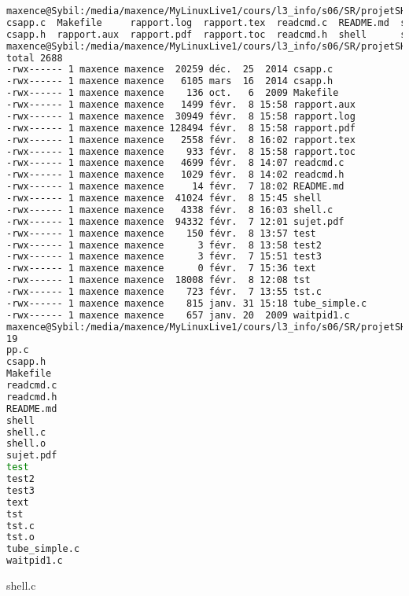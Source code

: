 \documentclass{report}
\begin{document}
		\begin{lstlisting}[frame=single,basicstyle=\footnotesize,language=bash]
maxence@Sybil:/media/maxence/MyLinuxLive1/cours/l3_info/s06/SR/projetSHELL$ ls
csapp.c  Makefile     rapport.log  rapport.tex  readcmd.c  README.md  shell.c    test   test3  tst    tube_simple.c
csapp.h  rapport.aux  rapport.pdf  rapport.toc  readcmd.h  shell      sujet.pdf  test2  text   tst.c  waitpid1.c
maxence@Sybil:/media/maxence/MyLinuxLive1/cours/l3_info/s06/SR/projetSHELL$ ls -l
total 2688
-rwx------ 1 maxence maxence  20259 déc.  25  2014 csapp.c
-rwx------ 1 maxence maxence   6105 mars  16  2014 csapp.h
-rwx------ 1 maxence maxence    136 oct.   6  2009 Makefile
-rwx------ 1 maxence maxence   1499 févr.  8 15:58 rapport.aux
-rwx------ 1 maxence maxence  30949 févr.  8 15:58 rapport.log
-rwx------ 1 maxence maxence 128494 févr.  8 15:58 rapport.pdf
-rwx------ 1 maxence maxence   2558 févr.  8 16:02 rapport.tex
-rwx------ 1 maxence maxence    933 févr.  8 15:58 rapport.toc
-rwx------ 1 maxence maxence   4699 févr.  8 14:07 readcmd.c
-rwx------ 1 maxence maxence   1029 févr.  8 14:02 readcmd.h
-rwx------ 1 maxence maxence     14 févr.  7 18:02 README.md
-rwx------ 1 maxence maxence  41024 févr.  8 15:45 shell
-rwx------ 1 maxence maxence   4338 févr.  8 16:03 shell.c
-rwx------ 1 maxence maxence  94332 févr.  7 12:01 sujet.pdf
-rwx------ 1 maxence maxence    150 févr.  8 13:57 test
-rwx------ 1 maxence maxence      3 févr.  8 13:58 test2
-rwx------ 1 maxence maxence      3 févr.  7 15:51 test3
-rwx------ 1 maxence maxence      0 févr.  7 15:36 text
-rwx------ 1 maxence maxence  18008 févr.  8 12:08 tst
-rwx------ 1 maxence maxence    723 févr.  7 13:55 tst.c
-rwx------ 1 maxence maxence    815 janv. 31 15:18 tube_simple.c
-rwx------ 1 maxence maxence    657 janv. 20  2009 waitpid1.c
maxence@Sybil:/media/maxence/MyLinuxLive1/cours/l3_info/s06/SR/projetSHELL$ cat test
19
pp.c
csapp.h
Makefile
readcmd.c
readcmd.h
README.md
shell
shell.c
shell.o
sujet.pdf
test
test2
test3
text
tst
tst.c
tst.o
tube_simple.c
waitpid1.c
		\end{lstlisting}
		shell.c
\end{document}
